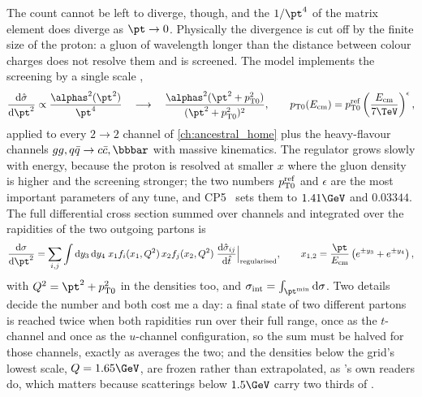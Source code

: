 The count cannot be left to diverge, though, and the $1/\pt^4$ of the
matrix element does diverge as $\pt\to0$. Physically the divergence is cut
off by the finite size of the proton: a gluon of wavelength longer than the
distance between colour charges does not resolve them and is screened. The
model implements the screening by a single scale \ptzero,
\begin{equation}
  \frac{\mathrm{d}\hat\sigma}{\mathrm{d}\pt^2}\propto
  \frac{\alphas^2(\pt^2)}{\pt^4}
  \quad\longrightarrow\quad
  \frac{\alphas^2(\pt^2+\ptzero^2)}{(\pt^2+\ptzero^2)^2},
  \qquad
  \ptzero(E_{\mathrm{cm}})=\ptzero^{\mathrm{ref}}\left(\frac{E_{\mathrm{cm}}}{7\TeV}\right)^{\epsilon},
  \label{eq:uninvited_cousins:regularised}
\end{equation}
applied to every $2\to2$ channel of \cref{ch:ancestral_home} plus the
heavy-flavour channels $gg,q\bar q\to c\bar c,\bbbar$ with massive
kinematics. The regulator grows slowly with energy, because the proton is
resolved at smaller $x$ where the gluon density is higher and the screening
stronger; the two numbers $p_{\mathrm{T}0}^{\mathrm{ref}}$ and $\epsilon$ are the
most important parameters of any tune, and CP5~\cite{CMS:2019csb} sets them
to $1.41\GeV$ and $0.03344$. The full differential cross section summed over
channels and integrated over the rapidities of the two outgoing partons is
\begin{equation}
  \frac{\mathrm{d}\sigma}{\mathrm{d}\pt^2}=\sum_{i,j}\int\mathrm{d}y_3\,\mathrm{d}y_4\;
  x_1f_i(x_1,Q^2)\,x_2f_j(x_2,Q^2)\;\frac{\mathrm{d}\hat\sigma_{ij}}{\mathrm{d}\hat t}
  \Big|_{\mathrm{regularised}},\qquad
  x_{1,2}=\frac{\pt}{E_{\mathrm{cm}}}\left(e^{\pm y_3}+e^{\pm y_4}\right),
  \label{eq:uninvited_cousins:dsigma}
\end{equation}
with $Q^2=\pt^2+\ptzero^2$ in the densities too, and
$\sigint=\int_{\pt^{\min}}\mathrm{d}\sigma$. Two details decide the number
and both cost me a day: a final state of two different partons is reached
twice when both rapidities run over their full range, once as the
$t$-channel and once as the $u$-channel configuration, so the sum must be
halved for those channels, exactly as \PYTHIA averages the two; and the
densities below the grid's lowest scale, $Q=1.65\GeV$, are frozen rather
than extrapolated, as \PYTHIA's own readers do, which matters because
scatterings below $1.5\GeV$ carry two thirds of \sigint.

